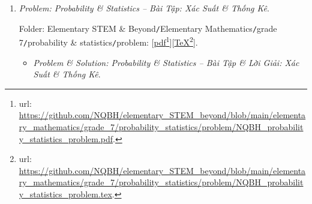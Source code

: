 \documentclass[12pt]{article}
\begin{document}
\begin{enumerate}
	Folder: {\sf Elementary STEM \& Beyond{\tt/}Elementary Mathematics{\tt/}grade 7{\tt/}angle parallel line{\tt/}problem}: [\href{https://github.com/NQBH/elementary_STEM_beyond/blob/main/elementary_mathematics/grade_7/angle_parallel_line/problem/NQBH_angle_parallel_line_problem.pdf}{pdf}\footnote{{\sc url}: \url{https://github.com/NQBH/elementary_STEM_beyond/blob/main/elementary_mathematics/grade_7/angle_parallel_line/problem/NQBH_angle_parallel_line_problem.pdf}.}][\href{https://github.com/NQBH/elementary_STEM_beyond/blob/main/elementary_mathematics/grade_7/angle_parallel_line/problem/NQBH_angle_parallel_line_problem.tex}{\TeX}\footnote{{\sc url}: \url{https://github.com/NQBH/elementary_STEM_beyond/blob/main/elementary_mathematics/grade_7/angle_parallel_line/problem/NQBH_angle_parallel_line_problem.tex}.}].
	\begin{itemize}
		\item {\it Problem \& Solution: Angle \& Parallel Line -- Bài Tập \& Lời Giải: Góc \& Đường Thẳng Song Song}.
		
		Folder: {\sf Elementary STEM \& Beyond{\tt/}Elementary Mathematics{\tt/}grade 7{\tt/}angle parallel line{\tt/}solution}: [\href{https://github.com/NQBH/elementary_STEM_beyond/blob/main/elementary_mathematics/grade_7/angle_parallel_line/solution/NQBH_angle_parallel_line_solution.pdf}{pdf}\footnote{{\sc url}: \url{https://github.com/NQBH/elementary_STEM_beyond/blob/main/elementary_mathematics/grade_7/angle_parallel_line/solution/NQBH_angle_parallel_line_solution.pdf}.}][\href{https://github.com/NQBH/elementary_STEM_beyond/blob/main/elementary_mathematics/grade_7/angle_parallel_line/solution/NQBH_angle_parallel_line_solution.tex}{\TeX}\footnote{{\sc url}: \url{https://github.com/NQBH/elementary_STEM_beyond/blob/main/elementary_mathematics/grade_7/angle_parallel_line/solution/NQBH_angle_parallel_line_solution.tex}.}].
	\end{itemize}
	\item {\it Problem: Probability \& Statistics -- Bài Tập: Xác Suất \& Thống Kê}.
	
	Folder: {\sf Elementary STEM \& Beyond{\tt/}Elementary Mathematics{\tt/}grade 7{\tt/}probability \& statistics{\tt/}problem}: [\href{https://github.com/NQBH/elementary_STEM_beyond/blob/main/elementary_mathematics/grade_7/probability_statistics/problem/NQBH_probability_statistics_problem.pdf}{pdf}\footnote{{\sc url}: \url{https://github.com/NQBH/elementary_STEM_beyond/blob/main/elementary_mathematics/grade_7/probability_statistics/problem/NQBH_probability_statistics_problem.pdf}.}][\href{https://github.com/NQBH/elementary_STEM_beyond/blob/main/elementary_mathematics/grade_7/probability_statistics/problem/NQBH_probability_statistics_problem.tex}{\TeX}\footnote{{\sc url}: \url{https://github.com/NQBH/elementary_STEM_beyond/blob/main/elementary_mathematics/grade_7/probability_statistics/problem/NQBH_probability_statistics_problem.tex}.}].
	\begin{itemize}
		\item {\it Problem \& Solution: Probability \& Statistics -- Bài Tập \& Lời Giải: Xác Suất \& Thống Kê}.
		

\end{itemize}
\end{enumerate}
\end{document}
